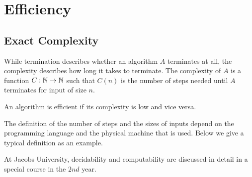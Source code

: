 \section{Efficiency}\label{sec:ad:complex}

\subsection{Exact Complexity}\label{sec:ad:complex:general}

While termination describes whether an algorithm $A$ terminates at all, the complexity describes how long it takes to terminate.
The complexity of $A$ is a function $C:\mathbb{N}\to\mathbb{N}$ such that $C(n)$ is the number of steps needed until $A$ terminates for input of size $n$.
\medskip

An algorithm is efficient if its complexity is low and vice versa.
\medskip

The definition of the number of steps and the sizes of inputs depend on the programming language and the physical machine that is used.
Below we give a typical definition as an example.

At Jacobs University, decidability and computability are discussed in detail in a special course in the $2nd$ year.

